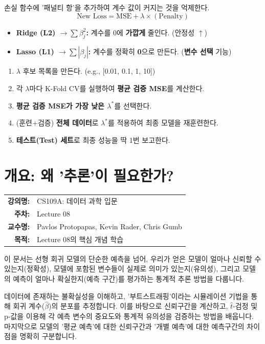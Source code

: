 \documentclass[11pt,a4paper]{book}
\makeatletter
\theoremstyle{definition}
\newcommand{\metainfo}[4]{
\begin{tcolorbox}[
    colback=lightpurple,
    colframe=darkpurple,
    boxrule=1pt,
    arc=2mm,
    left=10pt,
    right=10pt,
    top=8pt,
    bottom=8pt
]
\begin{tabular}{@{}rl@{}}
\textbf{강의명:} & #1 \\[0.3em]
\textbf{주차:} & #2 \\[0.3em]
\textbf{교수명:} & #3 \\[0.3em]
\textbf{목적:} & \begin{minipage}[t]{0.75\textwidth}#4\end{minipage}
\end{tabular}
\end{tcolorbox}
}
\makeatother
\begin{document}
\begin{tcolorbox}[title={3. 해결: 정규화 (Regularization)}]
손실 함수에 '패널티 항'을 추가하여 계수 값이 커지는 것을 억제한다.
$$
\text{New Loss} = \text{MSE} + \lambda \times (\text{Penalty})
$$
\end{tcolorbox}

\begin{tcolorbox}[title={4. 방법: Ridge (L2) vs. Lasso (L1)}]
\begin{itemize}
    \item \textbf{Ridge (L2) $\rightarrow \sum \beta_j^2$:} 
        계수를 0에 \textbf{가깝게} 줄인다. (안정성 $\uparrow$)
    \item \textbf{Lasso (L1) $\rightarrow \sum |\beta_j|$:} 
        계수를 정확히 \textbf{0}으로 만든다. (\textbf{변수 선택} 기능)
\end{itemize}
\end{tcolorbox}

\begin{tcolorbox}[title={5. 튜닝: 최적의 $\lambda$ 찾기 (by CV)}]
\begin{enumerate}
    \item $\lambda$ 후보 목록을 만든다. (e.g., [0.01, 0.1, 1, 10])
    \item 각 $\lambda$마다 K-Fold CV를 실행하여 \textbf{평균 검증 MSE}를 계산한다.
    \item \textbf{평균 검증 MSE가 가장 낮은 $\lambda^*$}를 선택한다.
    \item (훈련+검증) \textbf{전체 데이터}로 $\lambda^*$를 적용하여 최종 모델을 재훈련한다.
    \item \textbf{테스트(Test) 세트}로 최종 성능을 딱 1번 보고한다.
\end{enumerate}
\end{tcolorbox}


\chapter{개요: 왜 '추론'이 필요한가?}
\label{ch:lecture8}

\metainfo{CS109A: 데이터 과학 입문}{Lecture 08}{Pavlos Protopapas, Kevin Rader, Chris Gumb}{Lecture 08의 핵심 개념 학습}


\begin{summarybox}
\noindent
이 문서는 선형 회귀 모델의 단순한 예측을 넘어, 우리가 얻은 모델이 얼마나 신뢰할 수 있는지(정확성), 모델에 포함된 변수들이 실제로 의미가 있는지(유의성), 그리고 모델의 예측이 얼마나 확실한지(예측 구간)를 평가하는 통계적 추론 방법을 다룹니다.

데이터에 존재하는 불확실성을 이해하고, '부트스트래핑'이라는 시뮬레이션 기법을 통해 회귀 계수($\hat{\beta}$)의 분포를 추정합니다. 이를 바탕으로 신뢰구간을 계산하고, $\hat{t}$-검정 및 p-값을 이용해 각 예측 변수의 중요도와 통계적 유의성을 검증하는 방법을 배웁니다. 마지막으로 모델의 '평균 예측'에 대한 신뢰구간과 '개별 예측'에 대한 예측구간의 차이점을 명확히 구분합니다.
\end{summarybox}
\end{document}
